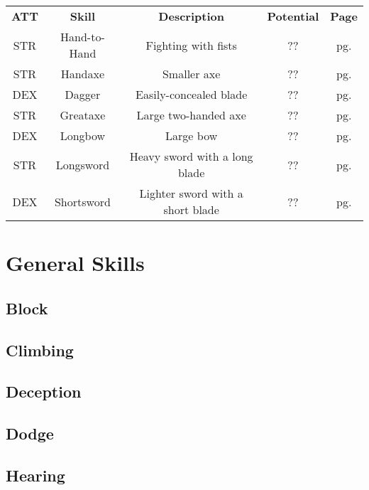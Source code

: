 \begin{table}[h!]
    \begin{tabular}{c c c c c}
        \bfseries{ATT} & \bfseries{Skill} & \bfseries{Description} & \bfseries{Potential} & \bfseries{Page} \\
        STR & Hand-to-Hand & Fighting with fists & ?? & pg. \pageref{skill:hand-to-hand} \\
        STR & Handaxe & Smaller axe & ?? & pg. \pageref{skill:handaxe} \\
        DEX & Dagger & Easily-concealed blade & ?? & pg. \pageref{skill:dagger} \\
        STR & Greataxe & Large two-handed axe & ?? & pg. \pageref{skill:greataxe} \\
        DEX & Longbow & Large bow & ?? & pg. \pageref{skill:longbow} \\
        STR & Longsword & Heavy sword with a long blade & ?? & pg. \pageref{skill:longsword} \\
        DEX & Shortsword & Lighter sword with a short blade & ?? & pg. \pageref{skill:shortsword} \\
    \end{tabular}
    \label{tab:weapon-skills}
\end{table}

\section{General Skills}

\subsection{Block}\label{skill:block}

\subsection{Climbing}\label{skill:climbing}

\subsection{Deception}\label{skill:deception}

\subsection{Dodge}\label{skill:dodge}

\subsection{Hearing}\label{skill:hearing}

